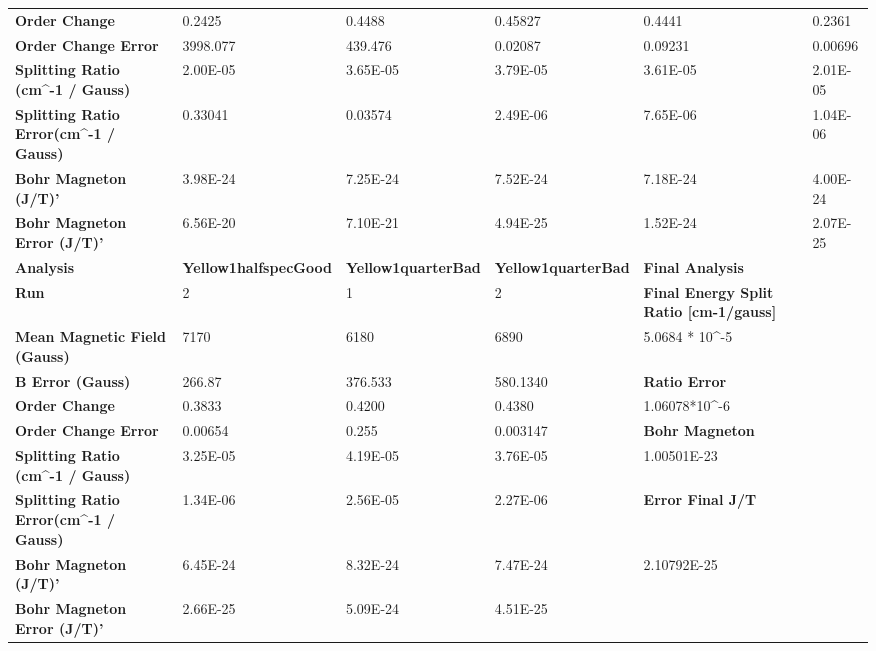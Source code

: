 \documentclass{article}
\begin{document}
{\begin{tabular}{llllll}
\multicolumn{1}{l|}{\textbf{Order Change}} & 0.2425 & 0.4488 & 0.45827 & 0.4441 & 0.2361 \\
\multicolumn{1}{l|}{\textbf{Order Change Error}} & 3998.077 & 439.476 & 0.02087 & 0.09231 & 0.00696 \\
\multicolumn{1}{l|}{\textbf{Splitting Ratio (cm^-1 / Gauss)}} & 2.00E-05 & 3.65E-05 & 3.79E-05 & 3.61E-05 & 2.01E-05 \\
\multicolumn{1}{l|}{\textbf{Splitting Ratio Error(cm^-1 / Gauss)}} & 0.33041 & 0.03574 & 2.49E-06 & 7.65E-06 & 1.04E-06 \\
\multicolumn{1}{l|}{\textbf{Bohr Magneton (J/T)'}} & 3.98E-24 & 7.25E-24 & 7.52E-24 & 7.18E-24 & 4.00E-24 \\
\multicolumn{1}{l|}{\textbf{Bohr Magneton Error (J/T)'}} & 6.56E-20 & 7.10E-21 & 4.94E-25 & 1.52E-24 & 2.07E-25 \\ \hline
\multicolumn{1}{l|}{\textbf{Analysis}} & \textbf{Yellow1halfspecGood} & \textbf{Yellow1quarterBad} & \multicolumn{1}{l|}{\textbf{Yellow1quarterBad}} & \textbf{Final Analysis} &  \\ \cline{2-4}
\multicolumn{1}{l|}{\textbf{Run}} & 2 & 1 & \multicolumn{1}{l|}{2} & \textbf{Final Energy Split Ratio [cm-1/gauss]} &  \\
\multicolumn{1}{l|}{\textbf{Mean Magnetic Field (Gauss)}} & 7170 & 6180 & \multicolumn{1}{l|}{6890} & 5.0684 * 10^{-5} &  \\
\multicolumn{1}{l|}{\textbf{B Error (Gauss)}} & 266.87 & 376.533 & \multicolumn{1}{l|}{580.1340} & \textbf{Ratio Error} &  \\
\multicolumn{1}{l|}{\textbf{Order Change}} & 0.3833 & 0.4200 & \multicolumn{1}{l|}{0.4380} & 1.06078*10^{-6} &  \\
\multicolumn{1}{l|}{\textbf{Order Change Error}} & 0.00654 & 0.255 & \multicolumn{1}{l|}{0.003147} & \textbf{Bohr Magneton} &  \\
\multicolumn{1}{l|}{\textbf{Splitting Ratio (cm^-1 / Gauss)}} & 3.25E-05 & 4.19E-05 & \multicolumn{1}{l|}{3.76E-05} & 1.00501E-23 &  \\
\multicolumn{1}{l|}{\textbf{Splitting Ratio Error(cm^-1 / Gauss)}} & 1.34E-06 & 2.56E-05 & \multicolumn{1}{l|}{2.27E-06} & \textbf{Error Final J/T} &  \\
\multicolumn{1}{l|}{\textbf{Bohr Magneton (J/T)'}} & 6.45E-24 & 8.32E-24 & \multicolumn{1}{l|}{7.47E-24} & 2.10792E-25 &  \\
\textbf{Bohr Magneton Error (J/T)'} & 2.66E-25 & 5.09E-24 & 4.51E-25 &  & 
\end{tabular}
}
\end{document}
